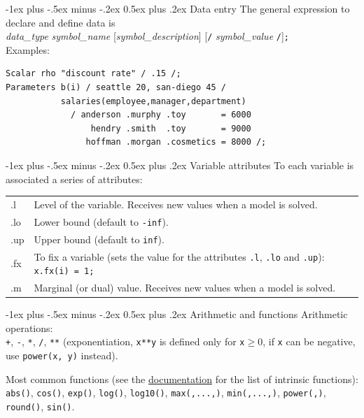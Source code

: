 \documentclass[10pt,landscape,a4paper]{article}
\makeatletter
\renewcommand{\section}{\@startsection{section}{1}{0mm}%
                                {-1ex plus -.5ex minus -.2ex}%
                                {0.5ex plus .2ex}%
                                {\color{blue}\normalfont\large\bfseries}}
\makeatother
\begin{document}
\begin{multicols}{2}
\section{Data entry}
The general expression to declare and define data is\\
\emph{data\_type} \emph{symbol\_name} [\emph{symbol\_description}] [\verb!/! \emph{symbol\_value} \verb!/!]\verb!;!\\
Examples:
\begin{verbatim}
Scalar rho "discount rate" / .15 /;
Parameters b(i) / seattle 20, san-diego 45 /
           salaries(employee,manager,department)
             / anderson .murphy .toy       = 6000
                 hendry .smith  .toy       = 9000
                hoffman .morgan .cosmetics = 8000 /;
\end{verbatim}

\section{Variable attributes}
To each variable is associated a series of attributes:\\
\begin{tabular}{@{}>{\ttfamily}ll@{}}
  .l & Level of the variable. Receives new values when a model is solved.\\
  .lo & Lower bound (default to \texttt{-inf}).\\
  .up & Upper bound (default to \texttt{inf}).\\
  .fx & To fix a variable (sets the value for the attributes \texttt{.l}, \texttt{.lo} and \texttt{.up}):\linebreak{}
  \texttt{x.fx(i) = 1;}\\
  .m & Marginal (or dual) value. Receives new values when a model is solved.
\end{tabular}

\section{Arithmetic and functions}
Arithmetic operations:\\
\verb!+!, \verb!-!, \verb!*!, \verb!/!, \verb!**! (exponentiation, \verb!x**y!
is defined only for \verb!x!$\ge$0, if \texttt{x} can be negative, use
\verb!power(x, y)! instead).

Most common functions
(see the \href{https://www.gams.com/latest/docs/UG_Parameters.html#UG_Parameters_IntrinsicFunctions}{documentation} for the list of intrinsic functions):\\
\verb!abs()!, \verb!cos()!, \verb!exp()!, \verb!log()!, \verb!log10()!,
\verb!max(,...,)!, \verb!min(,...,)!, \verb!power(,)!, \verb!round()!,
\verb!sin()!.


\end{multicols}
\end{document}
